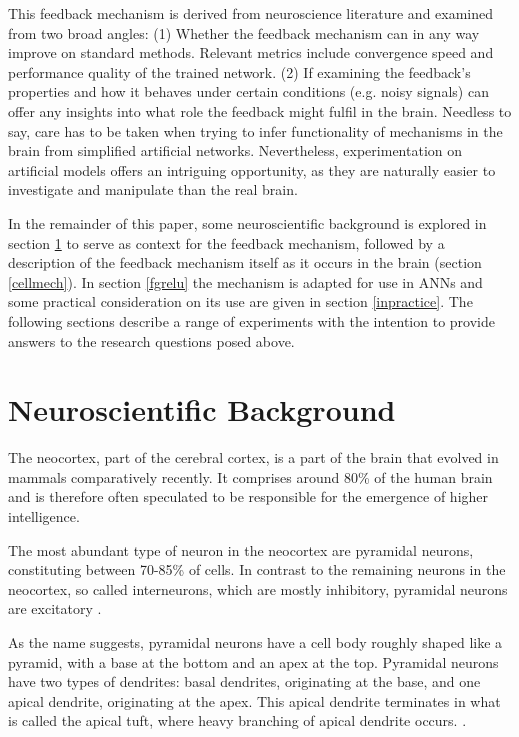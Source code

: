 \documentclass{article}
\begin{document}
This feedback mechanism is derived from neuroscience literature and examined from two broad angles: (1) Whether the feedback mechanism can in any way improve on standard methods. Relevant metrics include convergence speed and performance quality of the trained network. (2) If examining the feedback's properties and how it behaves under certain conditions (e.g. noisy signals) can offer any insights into what role the feedback might fulfil in the brain. Needless to say, care has to be taken when trying to infer functionality of mechanisms in the brain from simplified artificial networks. Nevertheless, experimentation on artificial models offers an intriguing opportunity, as they are naturally easier to investigate and manipulate than the real brain. 

In the remainder of this paper, some neuroscientific background is explored in section \ref{neocortex} to serve as context for the feedback mechanism, followed by a description of the feedback mechanism itself as it occurs in the brain (section \ref{cellmech}). In section \ref{fgrelu} the mechanism is adapted for use in ANNs and some practical consideration on its use are given in section \ref{inpractice}. The following sections describe a range of experiments with the intention to provide answers to the research questions posed above. 

\section{Neuroscientific Background}  
\label{neocortex}
The neocortex, part of the cerebral cortex, is a part of the brain that evolved in mammals comparatively recently. It comprises around 80\% of the human brain \cite{markram2004} and is therefore often speculated to be responsible for the emergence of higher intelligence. 

The most abundant type of neuron in the neocortex are pyramidal neurons, constituting between 70-85\% of cells. In contrast to the remaining neurons in the neocortex, so called interneurons, which are mostly inhibitory, pyramidal neurons are excitatory \cite{defelipe1992}. 

As the name suggests, pyramidal neurons have a cell body roughly shaped like a pyramid, with a base at the bottom and an apex at the top. Pyramidal neurons have two types of dendrites: basal dendrites, originating at the base, and one apical dendrite, originating at the apex. This apical dendrite terminates in what is called the apical tuft, where heavy branching of apical dendrite occurs. \cite{defelipe1992}. 
\end{document}
